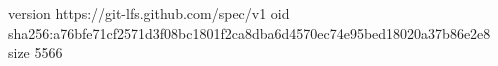 version https://git-lfs.github.com/spec/v1
oid sha256:a76bfe71cf2571d3f08bc1801f2ca8dba6d4570ec74e95bed18020a37b86e2e8
size 5566
